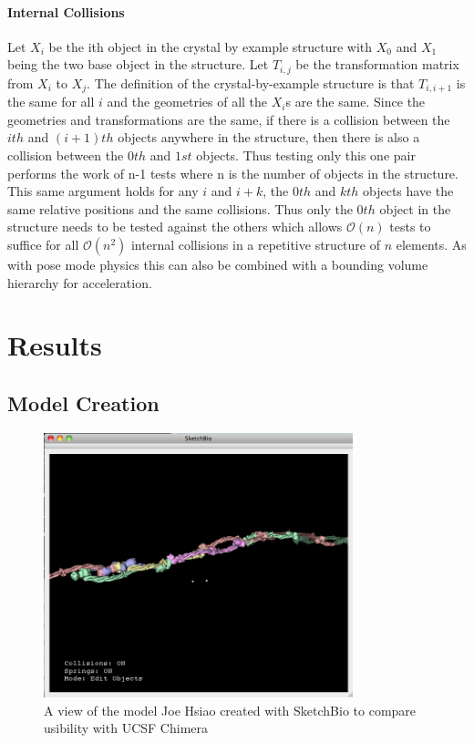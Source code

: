 \documentclass{article} %
\begin{document}
\paragraph{Internal Collisions}
Let $X_i$ be the ith object in the crystal by example structure with $X_0$ and $X_1$ being the two base object in the structure.  Let $T_{i,j}$ be the transformation matrix from $X_i$ to $X_j$.  The definition of the crystal-by-example structure is that $T_{i,i+1}$ is the same for all $i$ and the geometries of all the $X_i$s are the same.  Since the geometries and transformations are the same, if there is a collision between the $ith$ and $(i+1)th$ objects anywhere in the structure, then there is also a collision between the $0th$ and $1st$ objects.  Thus testing only this one pair performs the work of n-1 tests where n is the number of objects in the structure.  This same argument holds for any $i$ and $i+k$, the $0th$ and $kth$ objects have the same relative positions and the same collisions.  Thus only the $0th$ object in the structure needs to be tested against the others which allows $\mathcal{O}(n)$ tests to suffice for all $\mathcal{O}(n^2)$ internal collisions in a repetitive structure of $n$ elements.  As with pose mode physics this can also be combined with a bounding volume hierarchy for acceleration.

\section{Results}
\subsection{Model Creation}

\begin{figure}[h]
\centering
\includegraphics[width=0.8\textwidth]{joe_test.png}
\caption{A view of the model Joe Hsiao created with SketchBio to compare usibility with UCSF Chimera}
\label{fig:joe_test}
\end{figure}
\end{document}
